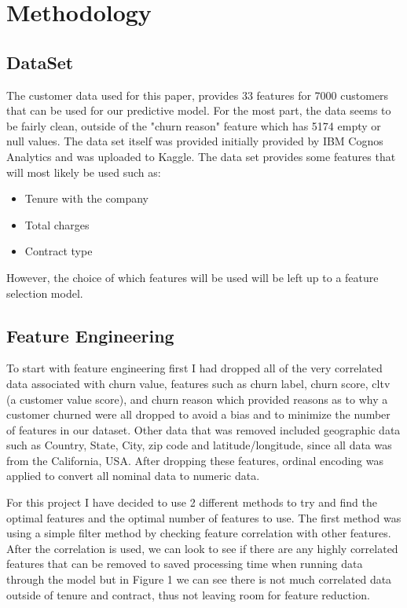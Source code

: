 \documentclass[12pt, a4paper]{article}
\begin{document}
\section{Methodology}
\subsection{DataSet}
The customer data used for this paper, provides 33 features for 7000 customers that can be used for our predictive model. For the most part, the data seems to be fairly clean, outside of the "churn reason" feature which has 5174 empty or null values. The data set itself was provided initially provided by IBM Cognos Analytics and was uploaded to Kaggle. The data set provides some features that will most likely be used such as:
\begin{itemize}
    \item Tenure with the company
    \item Total charges
    \item Contract type
\end{itemize}

However, the choice of which features will be used will be left up to a feature selection model.

\subsection{Feature Engineering}
To start with feature engineering first I had dropped all of the very correlated data associated with churn value, features such as churn label, churn score, cltv (a customer value score), and churn reason which provided reasons as to why a customer churned were all dropped to avoid a bias and to minimize the number of features in our dataset. Other data that was removed included geographic data such as Country, State, City, zip code and latitude/longitude, since all data was from the California, USA. After dropping these features, ordinal encoding was applied to convert all nominal data to numeric data.

For this project I have decided to use 2 different methods to try and find the optimal features and the optimal number of features to use. The first method was using a simple filter method by checking feature correlation with other features. After the correlation is used, we can look to see if there are any highly correlated features that can be removed to saved processing time when running data through the model but in Figure 1 we can see there is not much correlated data outside of tenure and contract, thus not leaving room for feature reduction.
\end{document}
